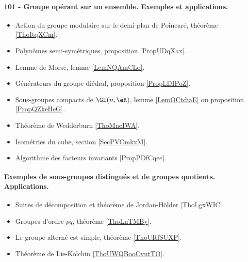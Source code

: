 \paragraph{101 - Groupe opérant sur un ensemble. Exemples et applications.}
\begin{itemize}
    \item Action du groupe modulaire sur le demi-plan de Poincaré, théorème \ref{ThoItqXCm}.
    \item Polynômes semi-symétriques, proposition \ref{PropUDqXax}.
    \item Lemme de Morse, lemme \ref{LemNQAmCLo}.
    \item Générateurs du groupe diédral, proposition \ref{PropLDIPoZ}.
    \item Sous-groupes compacts de \( \GL(n,\eR)\), lemme \ref{LemOCtdiaE} ou proposition \ref{PropQZkeHeG}.
    \item Théorème de Wedderburn \ref{ThoMncIWA}.
    \item Isométries du cube, section \ref{SecPVCmkxM}.
    \item Algorithme des facteurs invariants \ref{PropPDfCqee}.
\end{itemize}
\paragraph{Exemples de sous-groupes distingués et de groupes quotients. Applications.}
\begin{itemize}
    \item Suites de décomposition et théorème de Jordan-Hölder \ref{ThoLgxWIC}.
    \item Groupes d'ordre \( pq\), théorème \ref{ThoLnTMBy}.
    \item Le groupe alterné est simple, théorème \ref{ThoURfSUXP}.
    \item Théorème de Lie-Kolchin \ref{ThoUWQBooCvutTO}.
\end{itemize}
